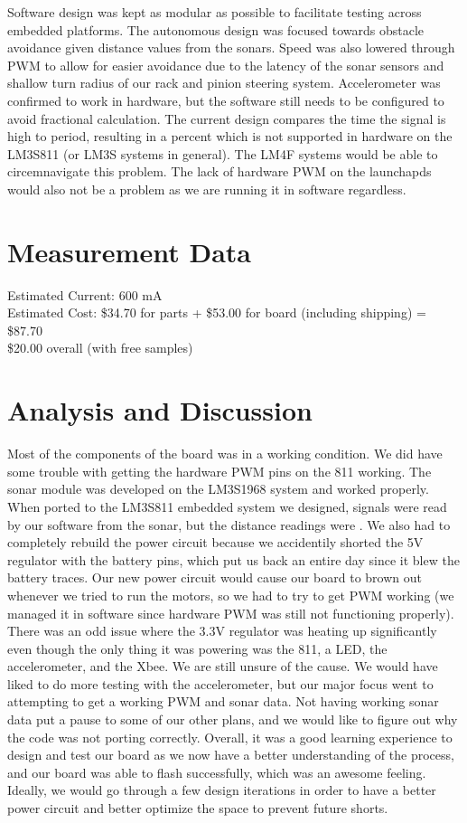 \documentclass[twoside]{article}
\begin{document}
Software design was kept as modular as possible to facilitate testing across embedded platforms. The autonomous design was focused towards obstacle avoidance given distance values from the sonars. Speed was also lowered through PWM to allow for easier avoidance due to the latency of the sonar sensors and shallow turn radius of our rack and pinion steering system. Accelerometer was confirmed to work in hardware, but the software still needs to be configured to avoid fractional calculation. The current design compares the time the signal is high to period, resulting in a percent which is not supported in hardware on the LM3S811 (or LM3S systems in general). The LM4F systems would be able to circemnavigate this problem. The lack of hardware PWM on the launchapds would also not be a problem as we are running it in software regardless.

\section{Measurement Data}
Estimated Current: 600 mA \\
Estimated Cost: \$34.70 for parts + \$53.00 for board (including shipping) = \$87.70 \\
\$20.00 overall (with free samples)

\section{Analysis and Discussion}
Most of the components of the board was in a working condition. We did have some trouble with getting the hardware PWM pins on the 811 working. The sonar module was developed on the LM3S1968 system and worked properly. When ported to the LM3S811 embedded system we designed, signals were read by our software from the sonar, but the distance readings were . We also had to completely rebuild the power circuit because we accidentily shorted the 5V regulator with the battery pins, which put us back an entire day since it blew the battery traces. Our new power circuit would cause our board to brown out whenever we tried to run the motors, so we had to try to get PWM working (we managed it in software since hardware PWM was still not functioning properly). There was an odd issue where the 3.3V regulator was heating up significantly even though the only thing it was powering was the 811, a LED, the accelerometer, and the Xbee. We are still unsure of the cause. We would have liked to do more testing with the accelerometer, but our major focus went to attempting to get a working PWM and sonar data. Not having working sonar data put a pause to some of our other plans, and we would like to figure out why the code was not porting correctly. Overall, it was a good learning experience to design and test our board as we now have a better understanding of the process, and our board was able to flash successfully, which was an awesome feeling. Ideally, we would go through a few design iterations in order to have a better power circuit and better optimize the space to prevent future shorts. 
 
\end{document}
